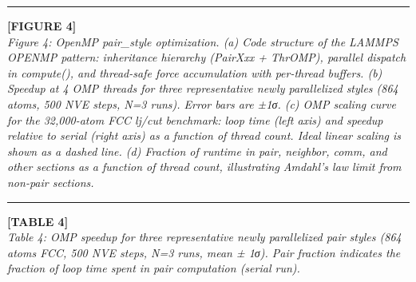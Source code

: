 \documentclass[
  11pt,
]{article}
\begin{document}
\begin{center}\rule{0.5\linewidth}{0.5pt}\end{center}

\textbf{{[}FIGURE 4{]}}\\
\emph{Figure 4: OpenMP pair\_style optimization. (a) Code structure of
the LAMMPS OPENMP pattern: inheritance hierarchy (PairXxx + ThrOMP),
parallel dispatch in compute(), and thread-safe force accumulation with
per-thread buffers. (b) Speedup at 4 OMP threads for three
representative newly parallelized styles (864 atoms, 500 NVE steps, N=3
runs). Error bars are ±1σ. (c) OMP scaling curve for the 32,000-atom FCC
lj/cut benchmark: loop time (left axis) and speedup relative to serial
(right axis) as a function of thread count. Ideal linear scaling is
shown as a dashed line. (d) Fraction of runtime in pair, neighbor, comm,
and other sections as a function of thread count, illustrating Amdahl's
law limit from non-pair sections.}

\begin{center}\rule{0.5\linewidth}{0.5pt}\end{center}

\textbf{{[}TABLE 4{]}}\\
\emph{Table 4: OMP speedup for three representative newly parallelized
pair styles (864 atoms FCC, 500 NVE steps, N=3 runs, mean ± 1σ). Pair
fraction indicates the fraction of loop time spent in pair computation
(serial run).}
\end{document}
